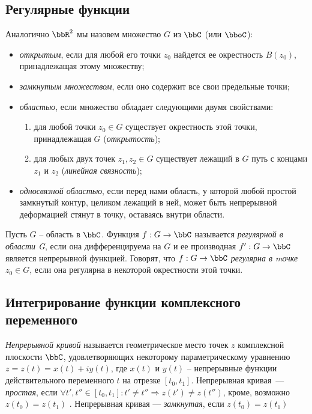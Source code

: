 \subsection{Регулярные функции}
Аналогично $\bbR^2$ мы назовем множество $G$ из $\bbC$ (или $\bboC$):
\begin{itemize}
\item
\textit{открытым}, если для любой его точки $z_0$ найдется ее окрестность $B(z_0)$, принадлежащая этому множеству;
\item
\textit{замкнутым множеством}, если оно содержит все свои предельные точки;
\item 
\textit{областью}, если множество обладает следующими двумя свойствами:
\begin{enumerate}
\item 
для любой точки $z_0 \in G$ существует окрестность этой точки, принадлежащая $G$ (\textit{открытость});
\item 
для любых двух точек $z_1,z_2 \in G$ существует лежащий в $G$ путь с концами $z_1$ и $z_2$ (\textit{линейная связность});
\end{enumerate}
\item
\textit{односвязной областью}, если перед нами область, у которой любой простой замкнутый контур, целиком лежащий в ней, может быть непрерывной деформацией стянут в точку, оставаясь внутри области. 
\end{itemize}

\begin{defn}
Пусть $G$ -- область в $\bbC$. Функция $f: G \to \bbC$ называется \textit{регулярной в области G}, если она дифференцируема на $G$ и ее производная $f' : G \to \bbC$ является непрерывной функцией. Говорят, что $f : G \to \bbC$ \textit{регулярна в mочке} $z_0 \in G$, если она регулярна в некоторой окрестности этой точки. 
\end{defn}


\subsection{Интегрирование функции комплексного переменного}
\begin{defn}
\textit{Непрерывной кривой} называется геометрическое место точек $z$ комплексной плоскости $\bbC$, удовлетворяющих некоторому параметрическому уравнению $z=z(t) = x(t) + iy(t)$, где $x(t)$ и $y(t)$ -- непрерывные функции действительного переменного $t$ на отрезке $[t_0,t_1]$. Непрерывная кривая~--- \textit{простая}, если $\forall t',t'' \in [t_0,t_1]: t'\ne t'' \Rightarrow z(t') \ne z(t'')  $, кроме, возможно $z(t_0) = z(t_1)$ . Непрерывная кривая --- \textit{замкнутая}, если  $z(t_0) = z(t_1)$ 
\end{defn}

